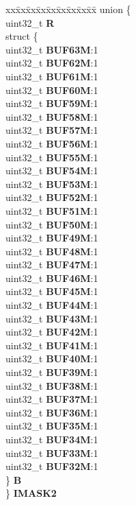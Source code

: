 \begin{DoxyCompactItemize}
\begin{tabbing}
\end{tabbing}\item 
\mbox{\label{structFLEXCAN__tag_a7d9bfdbb320557c7fae9dbbccc0d6d64}} 
\begin{tabbing}
xx\=xx\=xx\=xx\=xx\=xx\=xx\=xx\=xx\=\kill
union \{\\
\>uint32\_t {\bfseries R}\\
\>struct \{\\
\>\>uint32\_t {\bfseries BUF63M}:1\\
\>\>uint32\_t {\bfseries BUF62M}:1\\
\>\>uint32\_t {\bfseries BUF61M}:1\\
\>\>uint32\_t {\bfseries BUF60M}:1\\
\>\>uint32\_t {\bfseries BUF59M}:1\\
\>\>uint32\_t {\bfseries BUF58M}:1\\
\>\>uint32\_t {\bfseries BUF57M}:1\\
\>\>uint32\_t {\bfseries BUF56M}:1\\
\>\>uint32\_t {\bfseries BUF55M}:1\\
\>\>uint32\_t {\bfseries BUF54M}:1\\
\>\>uint32\_t {\bfseries BUF53M}:1\\
\>\>uint32\_t {\bfseries BUF52M}:1\\
\>\>uint32\_t {\bfseries BUF51M}:1\\
\>\>uint32\_t {\bfseries BUF50M}:1\\
\>\>uint32\_t {\bfseries BUF49M}:1\\
\>\>uint32\_t {\bfseries BUF48M}:1\\
\>\>uint32\_t {\bfseries BUF47M}:1\\
\>\>uint32\_t {\bfseries BUF46M}:1\\
\>\>uint32\_t {\bfseries BUF45M}:1\\
\>\>uint32\_t {\bfseries BUF44M}:1\\
\>\>uint32\_t {\bfseries BUF43M}:1\\
\>\>uint32\_t {\bfseries BUF42M}:1\\
\>\>uint32\_t {\bfseries BUF41M}:1\\
\>\>uint32\_t {\bfseries BUF40M}:1\\
\>\>uint32\_t {\bfseries BUF39M}:1\\
\>\>uint32\_t {\bfseries BUF38M}:1\\
\>\>uint32\_t {\bfseries BUF37M}:1\\
\>\>uint32\_t {\bfseries BUF36M}:1\\
\>\>uint32\_t {\bfseries BUF35M}:1\\
\>\>uint32\_t {\bfseries BUF34M}:1\\
\>\>uint32\_t {\bfseries BUF33M}:1\\
\>\>uint32\_t {\bfseries BUF32M}:1\\
\>\} {\bfseries B}\\
\} {\bfseries IMASK2}\\


\end{tabbing}
\end{DoxyCompactItemize}
